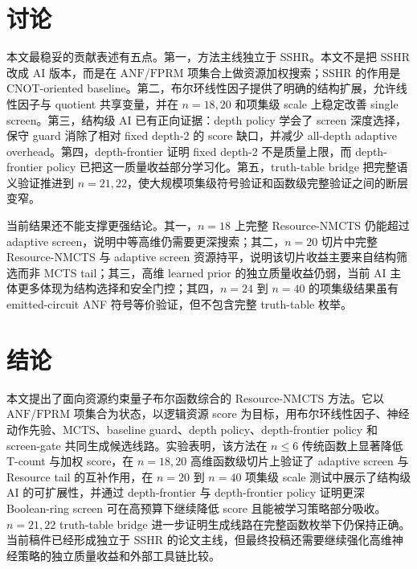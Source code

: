 \documentclass[UTF8,fontset=macnew,11pt]{ctexart}
\newcommand{\method}{Resource-NMCTS}
\newcommand{\anf}{\ensuremath{\mathrm{ANF}}}
\newcommand{\fprm}{\ensuremath{\mathrm{FPRM}}}
\newcommand{\mcts}{\ensuremath{\mathrm{MCTS}}}
\newcommand{\ttable}{truth-table}
\begin{document}
\section{讨论}

本文最稳妥的贡献表述有五点。第一，方法主线独立于 SSHR。本文不是把 SSHR 改成 AI 版本，而是在 \anf{}/\fprm{} 项集合上做资源加权搜索；SSHR 的作用是 CNOT-oriented baseline。第二，布尔环线性因子提供了明确的结构扩展，允许线性因子与 quotient 共享变量，并在 $n=18,20$ 和项集级 scale 上稳定改善 single screen。第三，结构级 AI 已有正向证据：depth policy 学会了 screen 深度选择，保守 guard 消除了相对 fixed depth-2 的 score 缺口，并减少 all-depth adaptive overhead。第四，depth-frontier 证明 fixed depth-2 不是质量上限，而 depth-frontier policy 已把这一质量收益部分学习化。第五，truth-table bridge 把完整语义验证推进到 $n=21,22$，使大规模项集级符号验证和函数级完整验证之间的断层变窄。

当前结果还不能支撑更强结论。其一，$n=18$ 上完整 \method{} 仍能超过 adaptive screen，说明中等高维仍需要更深搜索；其二，$n=20$ 切片中完整 \method{} 与 adaptive screen 资源持平，说明该切片收益主要来自结构筛选而非 MCTS tail；其三，高维 learned prior 的独立质量收益仍弱，当前 AI 主体更多体现为结构选择和安全门控；其四，$n=24$ 到 $n=40$ 的项集级结果虽有 emitted-circuit ANF 符号等价验证，但不包含完整 \ttable{} 枚举。

\section{结论}

本文提出了面向资源约束量子布尔函数综合的 \method{} 方法。它以 \anf{}/\fprm{} 项集合为状态，以逻辑资源 score 为目标，用布尔环线性因子、神经动作先验、\mcts{}、baseline guard、depth policy、depth-frontier policy 和 screen-gate 共同生成候选线路。实验表明，该方法在 $n\leq6$ 传统函数上显著降低 T-count 与加权 score，在 $n=18,20$ 高维函数级切片上验证了 adaptive screen 与 Resource tail 的互补作用，在 $n=20$ 到 $n=40$ 项集级 scale 测试中展示了结构级 AI 的可扩展性，并通过 depth-frontier 与 depth-frontier policy 证明更深 Boolean-ring screen 可在高预算下继续降低 score 且能被学习策略部分吸收。$n=21,22$ truth-table bridge 进一步证明生成线路在完整函数枚举下仍保持正确。当前稿件已经形成独立于 SSHR 的论文主线，但最终投稿还需要继续强化高维神经策略的独立质量收益和外部工具链比较。
\end{document}
